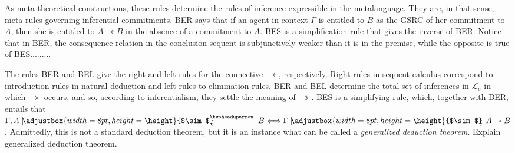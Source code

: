 \documentclass{article}
\makeatletter
\newcommand{\raisemath}[1]{\mathpalette{\raisem@th{#1}}}
\newcommand{\raisem@th}[3]{\raisebox{#1}{$#2#3$}}
\newcommand{\bigperpp}{%
  \mathop{\mathpalette\bigp@rpp\relax}%
  \displaylimits
}
\newcommand{\bigp@rpp}[2]{%
  \vcenter{
    \m@th\hbox{\scalebox{\ifx#1\displaystyle1.3\else1.3\fi}{$#1\perp$}}
  }%
}
\newcommand{\bigperp}{\raisemath{.5pt}{\bigperpp}}
\newcommand{\ssim}{%
     \setbox0=\hbox{$\sim$}%
     \adjustbox{width=8pt,height=\height}{$\sim$}
}
\newcommand{\thuarrow}{%
     \setbox0=\hbox{$\scriptstyle\twoheaduparrow$}%
     \raisebox{.2ex}{$\scriptstyle\twoheaduparrow$}
}
\newcommand{\nmc}{\mathbin{\mid\joinrel\!\!\ssim}}
\newcommand{\nme}{\mathrel{\nmc_{\!\!\!e\,}}}
\newcommand{\gsrce}[3][\Gamma,]{#1#2\mathrel{\nme}^{\!\!\!\!\!\thuarrow\scriptstyle\,\,}#3}
\makeatother
\begin{document}
As meta-theoretical constructions, these rules determine the rules of inference expressible in the metalanguage. They are, in that sense, meta-rules governing inferential commitments. BER says that if an agent in context $\Gamma$ is entitled to $ B $ as the GSRC of her commitment to $A$, then she is entitled to $ A \twoheadrightarrow B $ in the absence of a commitment to $A$. BES is a simplification rule that gives the inverse of BER. Notice that in BER, the consequence relation in the conclusion-sequent is subjunctively weaker than it is in the premise, while the opposite is true of BES.........


The rules BER and BEL give the right and left rules for the connective $\twoheadrightarrow$, respectively. Right rules in sequent calculus correspond to introduction rules in natural deduction and left rules to elimination rules. BER and BEL determine the total set of inferences in $\mathcal{L}_e$ in which $ \twoheadrightarrow $ occurs, and so, according to inferentialism, they settle the meaning of $ \twoheadrightarrow $. BES is a simplifying rule, which, together with BER, entails that $ \gsrce{A}{B} \Longleftrightarrow \Gamma \nme A \twoheadrightarrow B $. Admittedly, this is not a standard deduction theorem, but it is an instance what can be called a \textit{generalized deduction theorem}. \color{red} Explain generalized deduction theorem.\color{black} 


\end{document}
